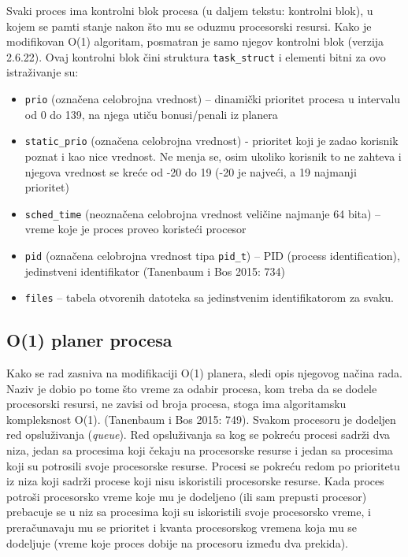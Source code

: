 Svaki proces ima kontrolni blok procesa (u daljem tekstu: kontrolni blok), u kojem se pamti stanje nakon što mu se oduzmu procesorski resursi. Kako je modifikovan O(1) algoritam, posmatran je samo njegov kontrolni blok (verzija 2.6.22).  Ovaj kontrolni blok čini struktura \texttt{task\_struct} i elementi bitni za ovo istraživanje su:

\begin{itemize}
    \item \texttt{prio} (označena celobrojna vrednost) -- dinamički prioritet procesa u intervalu od 0 do 139, na njega utiču bonusi/penali iz planera
    \item \texttt{static\_prio} (označena celobrojna vrednost) - prioritet koji je zadao korisnik poznat i kao nice vrednost. Ne menja se, osim ukoliko korisnik to ne zahteva i njegova vrednost se kreće od -20 do 19 (-20 je najveći, a 19 najmanji prioritet)
    \item \texttt{sched\_time} (neoznačena celobrojna vrednost veličine najmanje 64 bita) -- vreme koje je proces proveo koristeći procesor
    \item \texttt{pid} (označena celobrojna vrednost tipa \texttt{pid\_t}) -- PID (process identification), jedinstveni identifikator (Tanenbaum i Bos 2015: 734)
    \item \texttt{files} -- tabela otvorenih datoteka sa jedinstvenim identifikatorom za svaku.
\end{itemize}

\subsection{O(1) planer procesa}

Kako se rad zasniva na modifikaciji O(1) planera, sledi opis njegovog načina rada. Naziv je dobio po tome što vreme za odabir procesa, kom treba da se dodele procesorski resursi, ne zavisi od broja procesa, stoga ima algoritamsku kompleksnost O(1). (Tanenbaum i Bos 2015: 749). Svakom procesoru je dodeljen red opsluživanja (\emph{queue}). Red opsluživanja sa kog se pokreću procesi sadrži dva niza, jedan sa procesima koji čekaju na procesorske resurse i jedan sa procesima koji su potrosili svoje procesorske resurse. Procesi se pokreću redom po prioritetu iz niza koji sadrži procese koji nisu iskoristili procesorske resurse. Kada proces potroši procesorsko vreme koje mu je dodeljeno (ili sam prepusti procesor) prebacuje se u niz sa procesima koji su iskoristili svoje procesorsko vreme, i preračunavaju mu se prioritet i kvanta procesorskog vremena koja mu se dodeljuje (vreme koje proces dobije na procesoru između dva prekida).

